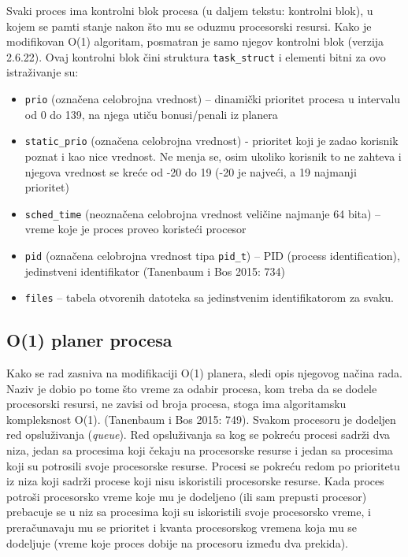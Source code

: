 Svaki proces ima kontrolni blok procesa (u daljem tekstu: kontrolni blok), u kojem se pamti stanje nakon što mu se oduzmu procesorski resursi. Kako je modifikovan O(1) algoritam, posmatran je samo njegov kontrolni blok (verzija 2.6.22).  Ovaj kontrolni blok čini struktura \texttt{task\_struct} i elementi bitni za ovo istraživanje su:

\begin{itemize}
    \item \texttt{prio} (označena celobrojna vrednost) -- dinamički prioritet procesa u intervalu od 0 do 139, na njega utiču bonusi/penali iz planera
    \item \texttt{static\_prio} (označena celobrojna vrednost) - prioritet koji je zadao korisnik poznat i kao nice vrednost. Ne menja se, osim ukoliko korisnik to ne zahteva i njegova vrednost se kreće od -20 do 19 (-20 je najveći, a 19 najmanji prioritet)
    \item \texttt{sched\_time} (neoznačena celobrojna vrednost veličine najmanje 64 bita) -- vreme koje je proces proveo koristeći procesor
    \item \texttt{pid} (označena celobrojna vrednost tipa \texttt{pid\_t}) -- PID (process identification), jedinstveni identifikator (Tanenbaum i Bos 2015: 734)
    \item \texttt{files} -- tabela otvorenih datoteka sa jedinstvenim identifikatorom za svaku.
\end{itemize}

\subsection{O(1) planer procesa}

Kako se rad zasniva na modifikaciji O(1) planera, sledi opis njegovog načina rada. Naziv je dobio po tome što vreme za odabir procesa, kom treba da se dodele procesorski resursi, ne zavisi od broja procesa, stoga ima algoritamsku kompleksnost O(1). (Tanenbaum i Bos 2015: 749). Svakom procesoru je dodeljen red opsluživanja (\emph{queue}). Red opsluživanja sa kog se pokreću procesi sadrži dva niza, jedan sa procesima koji čekaju na procesorske resurse i jedan sa procesima koji su potrosili svoje procesorske resurse. Procesi se pokreću redom po prioritetu iz niza koji sadrži procese koji nisu iskoristili procesorske resurse. Kada proces potroši procesorsko vreme koje mu je dodeljeno (ili sam prepusti procesor) prebacuje se u niz sa procesima koji su iskoristili svoje procesorsko vreme, i preračunavaju mu se prioritet i kvanta procesorskog vremena koja mu se dodeljuje (vreme koje proces dobije na procesoru između dva prekida).

